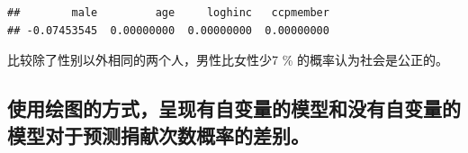 \documentclass[
]{ctexart}
\begin{document}
\begin{verbatim}
##        male         age     loghinc   ccpmember 
## -0.07453545  0.00000000  0.00000000  0.00000000
\end{verbatim}

比较除了性别以外相同的两个人，男性比女性少7 \% 的概率认为社会是公正的。

\hypertarget{ux4f7fux7528ux7ed8ux56feux7684ux65b9ux5f0fux5448ux73b0ux6709ux81eaux53d8ux91cfux7684ux6a21ux578bux548cux6ca1ux6709ux81eaux53d8ux91cfux7684ux6a21ux578bux5bf9ux4e8eux9884ux6d4bux6350ux732eux6b21ux6570ux6982ux7387ux7684ux5deeux522b}{%
\subsection{使用绘图的方式，呈现有自变量的模型和没有自变量的模型对于预测捐献次数概率的差别。}\label{ux4f7fux7528ux7ed8ux56feux7684ux65b9ux5f0fux5448ux73b0ux6709ux81eaux53d8ux91cfux7684ux6a21ux578bux548cux6ca1ux6709ux81eaux53d8ux91cfux7684ux6a21ux578bux5bf9ux4e8eux9884ux6d4bux6350ux732eux6b21ux6570ux6982ux7387ux7684ux5deeux522b}}
\end{document}
